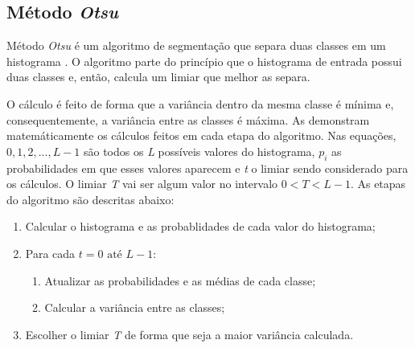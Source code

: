 \subsection{Método \textit{Otsu}}\label{sec:dom_esp:otsu}

\par Método \textit{Otsu} é um algoritmo de segmentação que separa duas classes em um histograma \cite{otsumethod}. O algoritmo parte do princípio que o histograma de entrada possui duas classes e, então, calcula um limiar que melhor as separa.

\par O cálculo é feito de forma que a variância dentro da mesma classe é mínima e, consequentemente, a variância entre as classes é máxima. As  demonstram matemáticamente os cálculos feitos em cada etapa do algoritmo. Nas equações, ${0, 1, 2, ..., L - 1}$ são todos os \textit{L} possíveis valores do histograma, $p_{i}$ as probabilidades em que esses valores aparecem e \textit{t} o limiar sendo considerado para os cálculos. O limiar \textit{T} vai ser algum valor no intervalo $0 < T < L - 1$. As etapas do algoritmo são descritas abaixo:

\begin{enumerate}
    \item Calcular o histograma e as probablidades de cada valor do histograma;
    \item 
        Para cada $t = 0 \text{ até } L-1$:
        \begin{enumerate}
            \item Atualizar as probabilidades e as médias de cada classe;
            \item Calcular a variância entre as classes;
        \end{enumerate}
    \item Escolher o limiar \textit{T} de forma que seja a maior variância calculada.
\end{enumerate}






